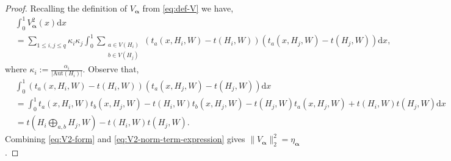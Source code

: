 \documentclass[11pt,reqno]{amsart}
\numberwithin{equation}{section}
\theoremstyle{definition}
\begin{document}
\begin{proof} 
Recalling the definition of $V_{\bm \alpha}$ from \eqref{eq:def-V} we have, 
\begin{align}\label{eq:V2-form}
    & \int_{0}^{1} V_{\bm \alpha}^{2}(x)\mathrm{d}x\nonumber\\
    & = \sum_{1 \leq i , j \leq q } \kappa_i \kappa_j \int_{0}^{1} \sum_{\substack{a\in V(H_{i})\\b\in V(H_{j})}}\left(t_{a}(x,H_{i},W) - t(H_{i},W)\right)\left(t_{a}(x,H_{j},W) - t(H_{j},W)\right)\mathrm{d}x , 
\end{align} 
where $\kappa_i := \frac{\alpha_{i}}{|\text{Aut}(H_{i})|}$. Observe that,
\begin{align}\label{eq:V2-norm-term-expression}
    & \int_0^1 \left(t_{a}(x,H_{i},W) - t(H_{i},W)\right) \left(t_{a}(x,H_{j},W) - t(H_{j},W)\right)\mathrm{d}x\nonumber\\
    & = \int_0^1 t_{a}(x,H_{i},W)t_{b}(x,H_{j},W)  - t(H_{i},W)t_{b}(x,H_{j},W) - t(H_{j},W)t_{a}(x,H_{j},W) + t(H_{i},W)t(H_{j},W)\mathrm{d}x\nonumber\\
    & = t\left(H_{i}\bigoplus_{a,b}H_{j},W\right) - t(H_{i},W)t(H_{j},W) . 
\end{align}
Combining \eqref{eq:V2-form} and \eqref{eq:V2-norm-term-expression} gives $\|V_{\bm \alpha}\|_{2}^{2}=\eta_{\bm \alpha}$. 



\end{proof}
\end{document}
